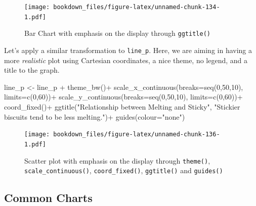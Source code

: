 \documentclass[
]{krantz}
\makeatletter
\newenvironment{Shaded}{\begin{snugshade}}{\end{snugshade}}
\newcommand{\AttributeTok}[1]{\textcolor[rgb]{0.61,0.61,0.61}{#1}}
\newcommand{\DecValTok}[1]{\textcolor[rgb]{0.06,0.06,0.06}{#1}}
\newcommand{\FunctionTok}[1]{\textcolor[rgb]{0,0,0}{#1}}
\newcommand{\NormalTok}[1]{#1}
\newcommand{\OtherTok}[1]{\textcolor[rgb]{0.37,0.37,0.37}{#1}}
\newcommand{\SpecialCharTok}[1]{\textcolor[rgb]{0,0,0}{#1}}
\newcommand{\StringTok}[1]{\textcolor[rgb]{0.5,0.5,0.5}{#1}}
\newenvironment{kframe}{%
\medskip{}
\setlength{\fboxsep}{.8em}
 \def\at@end@of@kframe{}%
 \ifinner\ifhmode%
  \def\at@end@of@kframe{\end{minipage}}%
  \begin{minipage}{\columnwidth}%
 \fi\fi%
 \def\FrameCommand##1{\hskip\@totalleftmargin \hskip-\fboxsep
 \colorbox{shadecolor}{##1}\hskip-\fboxsep
     \hskip-\linewidth \hskip-\@totalleftmargin \hskip\columnwidth}%
 \MakeFramed {\advance\hsize-\width
   \@totalleftmargin\z@ \linewidth\hsize
   \@setminipage}}%
 {\par\unskip\endMakeFramed%
 \at@end@of@kframe}
\renewenvironment{Shaded}{\begin{kframe}}{\end{kframe}}
\makeatother
\begin{document}
\begin{figure}
\centering
\texttt{[image: bookdown\_files/figure-latex/unnamed-chunk-134-1.pdf]}
\caption{\label{fig:unnamed-chunk-134}Bar Chart with emphasis on the display through \texttt{ggtitle()}}
\end{figure}

Let's apply a similar transformation to \texttt{line\_p}. Here, we are aiming in having a more \emph{realistic} plot using Cartesian coordinates, a nice theme, no legend, and a title to the graph.

\begin{Shaded}
\begin{Highlighting}[]
\NormalTok{line\_p }\OtherTok{\textless{}{-}}\NormalTok{ line\_p }\SpecialCharTok{+}
  \FunctionTok{theme\_bw}\NormalTok{()}\SpecialCharTok{+}
  \FunctionTok{scale\_x\_continuous}\NormalTok{(}\AttributeTok{breaks=}\FunctionTok{seq}\NormalTok{(}\DecValTok{0}\NormalTok{,}\DecValTok{50}\NormalTok{,}\DecValTok{10}\NormalTok{), }\AttributeTok{limits=}\FunctionTok{c}\NormalTok{(}\DecValTok{0}\NormalTok{,}\DecValTok{60}\NormalTok{))}\SpecialCharTok{+}
  \FunctionTok{scale\_y\_continuous}\NormalTok{(}\AttributeTok{breaks=}\FunctionTok{seq}\NormalTok{(}\DecValTok{0}\NormalTok{,}\DecValTok{50}\NormalTok{,}\DecValTok{10}\NormalTok{), }\AttributeTok{limits=}\FunctionTok{c}\NormalTok{(}\DecValTok{0}\NormalTok{,}\DecValTok{60}\NormalTok{))}\SpecialCharTok{+}
  \FunctionTok{coord\_fixed}\NormalTok{()}\SpecialCharTok{+}
  \FunctionTok{ggtitle}\NormalTok{(}\StringTok{"Relationship between Melting and Sticky"}\NormalTok{,}
          \StringTok{"Stickier biscuits tend to be less melting."}\NormalTok{)}\SpecialCharTok{+}
  \FunctionTok{guides}\NormalTok{(}\AttributeTok{colour=}\StringTok{"none"}\NormalTok{)}
\end{Highlighting}
\end{Shaded}

\begin{figure}
\centering
\texttt{[image: bookdown\_files/figure-latex/unnamed-chunk-136-1.pdf]}
\caption{\label{fig:unnamed-chunk-136}Scatter plot with emphasis on the display through \texttt{theme()}, \texttt{scale\_continuous()}, \texttt{coord\_fixed()}, \texttt{ggtitle()} and \texttt{guides()}}
\end{figure}

\hypertarget{common-charts}{%
\subsection{Common Charts}\label{common-charts}}
\end{document}
